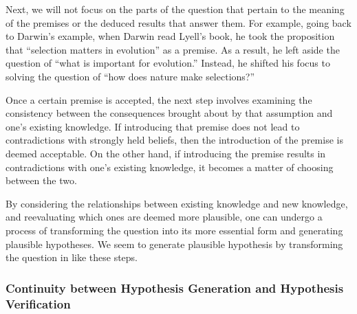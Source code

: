 Next, we will not focus on the parts of the question that pertain to the meaning of the premises or the deduced results that answer them. For example, going back to Darwin's example, when Darwin read Lyell's book, he took the proposition that ``selection matters in evolution'' as a premise. As a result, he left aside the question of ``what is important for evolution.'' Instead, he shifted his focus to solving the question of ``how does nature make selections?''

Once a certain premise is accepted, the next step involves examining the consistency between the consequences brought about by that assumption and one's existing knowledge. If introducing that premise does not lead to contradictions with strongly held beliefs, then the introduction of the premise is deemed acceptable. On the other hand, if introducing the premise results in contradictions with one's existing knowledge, it becomes a matter of choosing between the two. 



By considering the relationships between existing knowledge and new knowledge, and reevaluating which ones are deemed more plausible, one can undergo a process of transforming the question into its more essential form and generating plausible hypotheses. We seem to generate plausible hypothesis by transforming the question in like these steps.

\subsubsection{Continuity between Hypothesis Generation and Hypothesis Verification}

